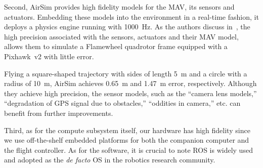 {Second, AirSim provides high fidelity models for the MAV, its sensors and actuators. Embedding these models into the environment in a real-time fashion, it deploys a physics engine running with 1000~\si{\hertz}.  As the authors discuss in~\cite{Airsim_paper}, the high precision associated with the sensors, actuators and their MAV model, allows them to simulate a Flamewheel quadrotor frame equipped with a Pixhawk~v2 with little error. 

Flying a square-shaped trajectory with sides of length 5~\si{\meter} and a circle with a radius of 10~\si{\meter},  AirSim achieves  0.65~\si{\meter} and 1.47~\si{\meter} error, respectively. Although they achieve high precision, the sensor models, such as the ``camera lens models,'' ``degradation of GPS signal due to obstacles,'' ``oddities in camera,'' etc. can benefit from further improvements. %

Third, as for the compute subsystem itself, our hardware has high fidelity since we use off-the-shelf embedded platforms for both the companion computer and the flight controller. As for the software, it is crucial to note ROS is widely used and adopted as the \textit{de facto} OS in the robotics research community.

}
